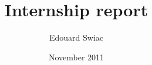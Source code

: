 \documentclass[12pt]{report}
\begin{document}
\title{Internship report}
\author{Edouard Swiac}
\date{November 2011}

\maketitle

\pagestyle{headings}





\tableofcontents














\nocite{*}


\end{document}
